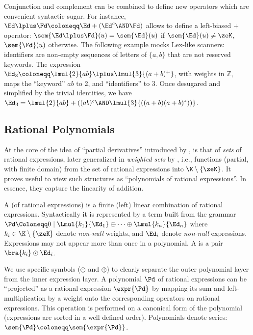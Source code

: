 \documentclass[a4paper,USenglish]{lipics}
\begin{document}
\begin{Example}
  \label{ex:ab}
  Conjunction and complement can be combined to define new operators which
  are convenient syntactic sugar.  For instance,
  $\Ed \lplus \Fd \coloneqq \Ed + (\Ed^c \AND \Fd)$ allows to define a
  left-biased $+$ operator: $\sem{\Ed \lplus \Fd}(u) = \sem{\Ed}(u)$ if
  $\sem{\Ed}(u) \neq \zeK$, $\sem{\Fd}(u)$ otherwise.  The following example
  mocks Lex-like scanners: identifiers are non-empty sequences of letters of
  $\{a, b\}$ that are not reserved keywords.  The expression
  $\Ed_3 \coloneqq \lmul{2}{ab} \lplus \lmul{3}{(a+b)^+}$, with weights in
  $\mathbb{Z}$, maps the ``keyword'' $ab$ to 2, and ``identifiers'' to 3.
  Once desugared and simplified by the trivial identities, we have
  $\Ed_3 = \lmul{2}{ab} + ((ab)^{c} \AND \lmul{3}{((a+b)(a+b)^*))}$.
\end{Example}


\subsection{Rational Polynomials}
\label{sec:poly}

At the core of the idea of ``partial derivatives'' introduced by
\citet{antimirov.1996.tcs}, is that of \emph{sets} of rational expressions,
later generalized in \emph{weighted sets} by \citet{lombardy.2005.tcs},
i.e., functions (partial, with finite domain) from the set of rational
expressions into $\K \setminus \{\zeK\}$.  It proves useful to view such
structures as ``polynomials of rational expressions''.  In essence, they
capture the linearity of addition.

\begin{Definition}
  A  (of rational expressions) is a finite (left) linear
  combination of rational expressions.  Syntactically it is represented by a
  term built from the grammar
  \begin{math}
    \Pd \Coloneqq 0
    \mid \Lmul{k_1}{\Ed_1} \oplus \cdots \oplus \Lmul{k_n}{\Ed_n}
  \end{math}
  where $k_i\in \K\setminus \{\zeK\}$ denote \emph{non-null} weights, and
  $\Ed_i$ denote \emph{non-null} expressions.  Expressions may not appear
  more than once in a polynomial.  A  is a pair
  $\bra{k_i} \odot \Ed_i$.
\end{Definition}

We use specific symbols ($\odot$ and $\oplus$) to clearly separate the outer
polynomial layer from the inner expression layer.
A polynomial $\Pd$ of rational expressions can be ``projected'' as a
rational expression $\expr{\Pd}$ by mapping its sum and left-multiplication
by a weight onto the corresponding operators on rational expressions.  This
operation is performed on a canonical form of the polynomial (expressions
are sorted in a well defined order).  Polynomials denote series:
$\sem{\Pd} \coloneqq \sem{\expr{\Pd}}$.
\end{document}
